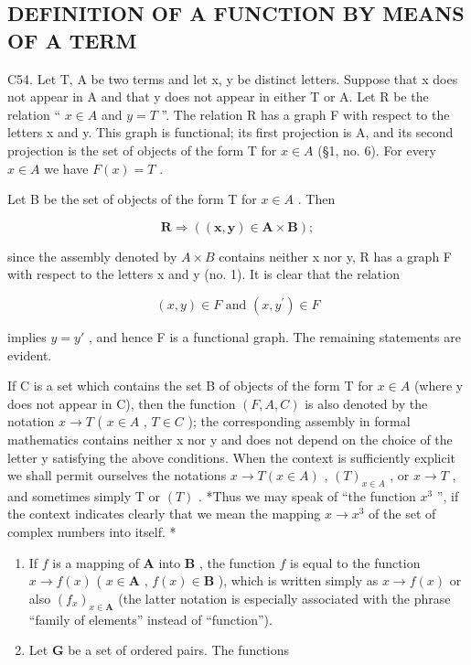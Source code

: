 \subsection{DEFINITION OF A FUNCTION BY MEANS OF A TERM}

C54. Let T, A be two terms and let x, y be distinct letters. Suppose that x does not appear in A and that y does not appear in either T or A. Let R be the relation `` \(x \in A\) and \(y = T\) ''. The relation R has a graph F with respect to the letters x and y. This graph is functional; its first projection is A, and its second projection is the set of objects of the form T for \(x \in A\) (§1, no. 6). For every \(x \in A\) we have \(F(x) = T\) .

Let B be the set of objects of the form T for \(x \in A\) . Then

\[
\boldsymbol {R} \Longrightarrow ((\boldsymbol {x}, \boldsymbol {y}) \in \boldsymbol {A} \times \boldsymbol {B});
\]

since the assembly denoted by \(A \times B\) contains neither x nor y, R has a graph F with respect to the letters x and y (no. 1). It is clear that the relation

\[
(x, y) \in F \text {   and   } (x, y ^ {\prime}) \in F
\]

implies \(y = y'\) , and hence F is a functional graph. The remaining statements are evident.

If C is a set which contains the set B of objects of the form T for \(x \in A\) (where y does not appear in C), then the function \((F, A, C)\) is also denoted by the notation \(x \to T\) ( \(x \in A\) , \(T \in C\) ); the corresponding assembly in formal mathematics contains neither x nor y and does not depend on the choice of the letter y satisfying the above conditions. When the context is sufficiently explicit we shall permit ourselves the notations \(x \to T(x \in A)\) , \((T)_{x \in A}\) , or \(x \to T\) , and sometimes simply T or \((T)\) . *Thus we may speak of ``the function \(x^{3}\) '', if the context indicates clearly that we mean the mapping \(x \to x^{3}\) of the set of complex numbers into itself. *


\begin{enumerate}
\def\labelenumi{(\arabic{enumi})}
\item
  If \(f\) is a mapping of \(\mathbf{A}\) into \(\mathbf{B}\) , the function \(f\) is equal to the function \(x \to f(x)\) ( \(x \in \mathbf{A}\) , \(f(x) \in \mathbf{B}\) ), which is written simply as \(x \to f(x)\) or also \((f_x)_{x \in \mathbf{A}}\) (the latter notation is especially associated with the phrase ``family of elements'' instead of ``function'').
\item
  Let \(\mathbf{G}\) be a set of ordered pairs. The functions
\end{enumerate}

